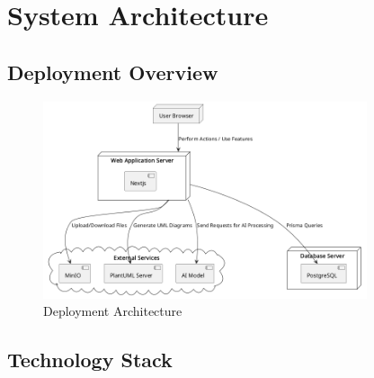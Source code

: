 \section{System Architecture}

\subsection{Deployment Overview}

\begin{figure}[H]
    \centering
    \includegraphics[width=0.85\textwidth]{./conception/deployement_diagram.png}
    \caption{Deployment Architecture}
    \label{fig:deployment}
\end{figure}

\subsection{Technology Stack}

